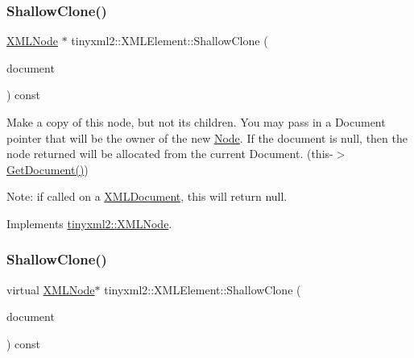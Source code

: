\subsubsection{\texorpdfstring{Shallow\+Clone()}{ShallowClone()}\hspace{0.1cm}{\footnotesize\ttfamily [1/2]}}
{\footnotesize\ttfamily \hyperlink{classtinyxml2_1_1XMLNode}{X\+M\+L\+Node} $\ast$ tinyxml2\+::\+X\+M\+L\+Element\+::\+Shallow\+Clone (\begin{DoxyParamCaption}\item[{\hyperlink{classtinyxml2_1_1XMLDocument}{X\+M\+L\+Document} $\ast$}]{document }\end{DoxyParamCaption}) const\hspace{0.3cm}{\ttfamily [virtual]}}

Make a copy of this node, but not its children. You may pass in a Document pointer that will be the owner of the new \hyperlink{classNode}{Node}. If the \textquotesingle{}document\textquotesingle{} is null, then the node returned will be allocated from the current Document. (this-\/$>$\hyperlink{classtinyxml2_1_1XMLNode_af343d1ef0b45c0020e62d784d7e67a68}{Get\+Document()})

Note\+: if called on a \hyperlink{classtinyxml2_1_1XMLDocument}{X\+M\+L\+Document}, this will return null. 

Implements \hyperlink{classtinyxml2_1_1XMLNode_a8402cbd3129d20e9e6024bbcc0531283}{tinyxml2\+::\+X\+M\+L\+Node}.

\mbox{\label{classtinyxml2_1_1XMLElement_ac035742d68b0c50c3f676374e59fe750}} 
\subsubsection{\texorpdfstring{Shallow\+Clone()}{ShallowClone()}\hspace{0.1cm}{\footnotesize\ttfamily [2/2]}}
{\footnotesize\ttfamily virtual \hyperlink{classtinyxml2_1_1XMLNode}{X\+M\+L\+Node}$\ast$ tinyxml2\+::\+X\+M\+L\+Element\+::\+Shallow\+Clone (\begin{DoxyParamCaption}\item[{\hyperlink{classtinyxml2_1_1XMLDocument}{X\+M\+L\+Document} $\ast$}]{document }\end{DoxyParamCaption}) const\hspace{0.3cm}{\ttfamily [virtual]}}

